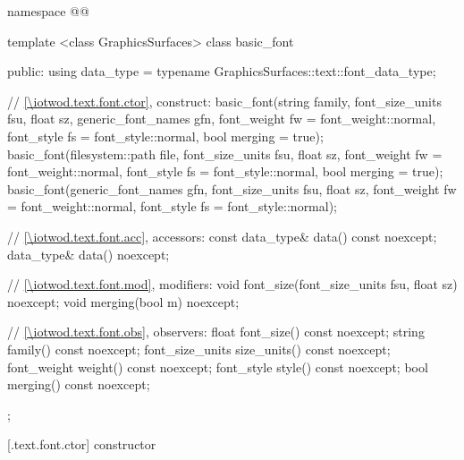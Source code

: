 \begin{codeblock}
namespace @\fullnamespace{}@ {
  template <class GraphicsSurfaces>
  class basic_font {
  public:
    using data_type = typename GraphicsSurfaces::text::font_data_type;

    // \ref{\iotwod.text.font.ctor}, construct:
    basic_font(string family, font_size_units fsu, float sz,
      generic_font_names gfn, font_weight fw = font_weight::normal,
      font_style fs = font_style::normal, bool merging = true);
    basic_font(filesystem::path file, font_size_units fsu, float sz, 
      font_weight fw = font_weight::normal, font_style fs = font_style::normal, 
      bool merging = true);
    basic_font(generic_font_names gfn, font_size_units fsu, float sz, 
      font_weight fw = font_weight::normal, font_style fs = font_style::normal);

    // \ref{\iotwod.text.font.acc}, accessors:
    const data_type& data() const noexcept;
    data_type& data() noexcept;

    // \ref{\iotwod.text.font.mod}, modifiers:
    void font_size(font_size_units fsu, float sz) noexcept;
    void merging(bool m) noexcept;

    // \ref{\iotwod.text.font.obs}, observers:
    float font_size() const noexcept;
    string family() const noexcept;
    font_size_units size_units() const noexcept;
    font_weight weight() const noexcept;
    font_style style() const noexcept;
    bool merging() const noexcept;
  };
}
\end{codeblock}

 [\iotwod.text.font.ctor] { constructor}

